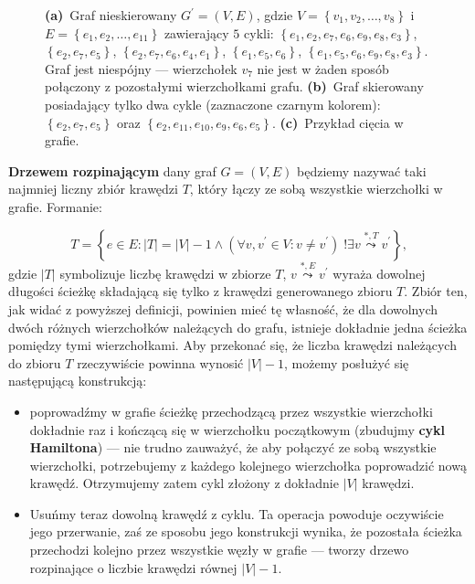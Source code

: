 \begin{figure}[!htbp]
\begin{subfigure}[b]{0.32\textwidth}
		\caption{}
		\label{fig:defExample:c}
	\end{subfigure}
	\hfill\null
	\caption{
		\textbf{(a)}~Graf nieskierowany $G^{\prime} = \left( V, E \right)$, gdzie $V = \left\{ v_{1}, v_{2}, \dots, v_{8} \right\}$ i $E = \left\{ e_{1}, e_{2}, \dots, e_{11} \right\}$ zawierający $5$ cykli: $\left\{ e_{1}, e_{2}, e_{7}, e_{6}, e_{9}, e_{8}, e_{3} \right\}$, $\left\{ e_{2}, e_{7}, e_{5} \right\}$, $\left\{ e_{2}, e_{7}, e_{6}, e_{4}, e_{1} \right\}$, $\left\{ e_{1}, e_{5}, e_{6} \right\}$, $\left\{ e_{1}, e_{5}, e_{6}, e_{9}, e_{8}, e_{3} \right\}$. Graf jest niespójny --- wierzchołek $v_{7}$ nie jest w żaden sposób połączony z pozostałymi wierzchołkami grafu.
		\textbf{(b)}~Graf skierowany posiadający tylko dwa cykle (zaznaczone czarnym kolorem): $\left\{ e_{2}, e_{7}, e_{5} \right\}$ oraz $\left\{ e_{2}, e_{11}, e_{10}, e_{9}, e_{6}, e_{5} \right\}$.
		\textbf{(c)}~Przykład cięcia w grafie.
	}
	\label{fig:defExample}
\end{figure}

\textbf{Drzewem rozpinającym} dany graf $G = \left( V, E \right)$ będziemy nazywać taki najmniej liczny zbiór krawędzi $T$, który łączy ze sobą wszystkie wierzchołki w grafie. Formanie:

\begin{equation}
	T = \left\{ e \in E : \left| T \right| = \left| V \right| - 1 \wedge \left( \forall v, v^{\prime} \in V : v \neq v^{\prime} \right) \; !\exists v \overset{\ast, T}{\leadsto} v^{\prime} \right\}\text{,}
\end{equation}
gdzie $\left| T \right|$ symbolizuje liczbę krawędzi w zbiorze $T$, $v \overset{\ast, E}{\leadsto} v^{\prime}$ wyraża dowolnej długości ścieżkę składającą się tylko z krawędzi generowanego zbioru $T$. Zbiór ten, jak widać z powyższej definicji, powinien mieć tę własność, że dla dowolnych dwóch różnych wierzchołków należących do grafu, istnieje dokładnie jedna ścieżka pomiędzy tymi wierzchołkami. Aby przekonać się, że liczba krawędzi należących do zbioru $T$ rzeczywiście powinna wynosić $\left| V \right| - 1$, możemy posłużyć się następującą konstrukcją:

\begin{itemize}
	\item poprowadźmy w grafie ścieżkę przechodzącą przez wszystkie wierzchołki dokładnie raz i kończącą się w wierzchołku początkowym (zbudujmy \textbf{cykl Hamiltona}) --- nie trudno zauważyć, że aby połączyć ze sobą wszystkie wierzchołki, potrzebujemy z każdego kolejnego wierzchołka poprowadzić nową krawędź. Otrzymujemy zatem cykl złożony z dokładnie $\left| V \right|$ krawędzi.
	\item Usuńmy teraz dowolną krawędź z cyklu. Ta operacja powoduje oczywiście jego przerwanie, zaś ze sposobu jego konstrukcji wynika, że pozostała ścieżka przechodzi kolejno przez wszystkie węzły w grafie --- tworzy drzewo rozpinające o liczbie krawędzi równej $\left| V \right| - 1$.
\end{itemize}


